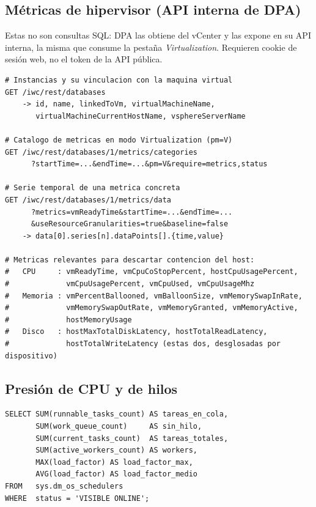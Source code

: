 \documentclass[11pt,a4paper]{article}
\begin{document}
\subsection{Métricas de hipervisor (API interna de DPA)}

Estas no son consultas SQL: DPA las obtiene del vCenter y las expone en su API
interna, la misma que consume la pestaña \emph{Virtualization}. Requieren
cookie de sesión web, no el token de la API pública.

\begin{lstlisting}[style=sql]
# Instancias y su vinculacion con la maquina virtual
GET /iwc/rest/databases
    -> id, name, linkedToVm, virtualMachineName,
       virtualMachineCurrentHostName, vsphereServerName

# Catalogo de metricas en modo Virtualization (pm=V)
GET /iwc/rest/databases/1/metrics/categories
      ?startTime=...&endTime=...&pm=V&require=metrics,status

# Serie temporal de una metrica concreta
GET /iwc/rest/databases/1/metrics/data
      ?metrics=vmReadyTime&startTime=...&endTime=...
      &useResourceGranularities=true&baseline=false
    -> data[0].series[n].dataPoints[].{time,value}

# Metricas relevantes para descartar contencion del host:
#   CPU     : vmReadyTime, vmCpuCoStopPercent, hostCpuUsagePercent,
#             vmCpuUsagePercent, vmCpuUsed, vmCpuUsageMhz
#   Memoria : vmPercentBallooned, vmBalloonSize, vmMemorySwapInRate,
#             vmMemorySwapOutRate, vmMemoryGranted, vmMemoryActive,
#             hostMemoryUsage
#   Disco   : hostMaxTotalDiskLatency, hostTotalReadLatency,
#             hostTotalWriteLatency (estas dos, desglosadas por dispositivo)
\end{lstlisting}

\subsection{Presión de CPU y de hilos}

\begin{lstlisting}[style=sql]
SELECT SUM(runnable_tasks_count) AS tareas_en_cola,
       SUM(work_queue_count)     AS sin_hilo,
       SUM(current_tasks_count)  AS tareas_totales,
       SUM(active_workers_count) AS workers,
       MAX(load_factor) AS load_factor_max,
       AVG(load_factor) AS load_factor_medio
FROM   sys.dm_os_schedulers
WHERE  status = 'VISIBLE ONLINE';
\end{lstlisting}
\end{document}
